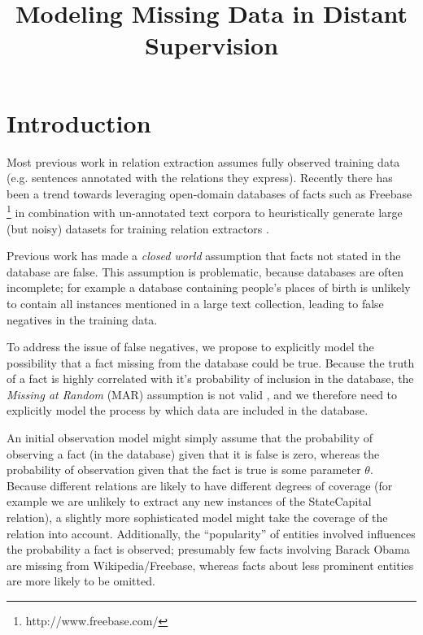 \documentclass[12pt]{article}
\begin{document}
\date{}
\title{Modeling Missing Data in Distant Supervision}
\author{}
\maketitle



\section{Introduction}
Most previous work in relation extraction assumes fully observed training data (e.g. sentences annotated with the relations they express).
Recently there has been a trend towards leveraging open-domain databases of facts such as Freebase \footnote{http://www.freebase.com/} in combination with un-annotated text corpora to heuristically 
generate large (but noisy) datasets for training relation extractors \citep{mintz09,Hoffmann11}.

Previous work has made a \emph{closed world} assumption that facts not stated in the database are false.  
This assumption is problematic, because databases are often incomplete; for example a database 
containing people's places of birth is unlikely to contain all instances mentioned in a large text collection, leading to false negatives in
the training data.

To address the issue of false negatives, we propose to explicitly model the possibility that a fact missing from the database could
be true.  Because the truth of a fact is highly correlated with it's probability of inclusion in the database, the
\emph{Missing at Random} (MAR) assumption is not valid  \citep{Schafer02}, and we therefore need to explicitly model
the process by which data are included in the database.

An initial observation model might simply assume that the probability of observing a fact (in the database) given that it is false is zero, whereas
the probability of observation given that the fact is true is some parameter $\theta$.  Because different relations are likely
to have different degrees of coverage (for example we are unlikely to extract any new instances of the {\sc StateCapital} relation),
a slightly more sophisticated model might take the coverage of the relation into account.  Additionally, the ``popularity'' of 
entities involved influences the probability a fact is observed; presumably few facts involving Barack Obama are missing from
Wikipedia/Freebase, whereas facts about less prominent entities are more likely to be omitted.
\end{document}

